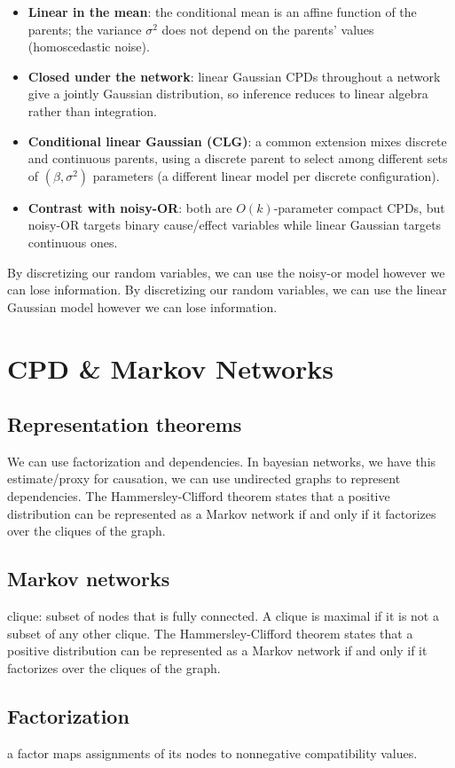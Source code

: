 \documentclass[11pt]{article}
\begin{document}
\begin{itemize}
  \item \textbf{Linear in the mean}: the conditional mean is an affine function
    of the parents; the variance $\sigma^2$ does not depend on the parents'
    values (homoscedastic noise).
  \item \textbf{Closed under the network}: linear Gaussian CPDs throughout a
    network give a jointly Gaussian distribution, so inference reduces to
    linear algebra rather than integration.
  \item \textbf{Conditional linear Gaussian (CLG)}: a common extension mixes
    discrete and continuous parents, using a discrete parent to select among
    different sets of $(\beta, \sigma^2)$ parameters (a different linear model
    per discrete configuration).
  \item \textbf{Contrast with noisy-OR}: both are $O(k)$-parameter compact CPDs,
    but noisy-OR targets binary cause/effect variables while linear Gaussian
    targets continuous ones.
\end{itemize}

By discretizing our random variables, we can use the noisy-or model however we can lose information. By discretizing our random variables, we can use the linear Gaussian model however we can lose information.

\section{CPD \& Markov Networks}
\subsection{Representation theorems}
We can use factorization and dependencies.
In bayesian networks, we have this estimate/proxy for causation, we can use undirected graphs to represent dependencies. The Hammersley-Clifford theorem states that a positive distribution can be represented as a Markov network if and only if it factorizes over the cliques of the graph.
\subsection{Markov networks}
clique: subset of nodes that is fully connected. A clique is maximal if it is not a subset of any other clique. The Hammersley-Clifford theorem states that a positive distribution can be represented as a Markov network if and only if it factorizes over the cliques of the graph.
\subsection{Factorization}
a factor maps assignments of its nodes to nonnegative compatibility values.
\end{document}
